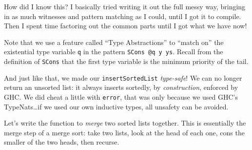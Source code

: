 \documentclass[]{article}
\begin{document}
How did I know this? I basically tried writing it out the full messy way,
bringing in as much witnesses and pattern matching as I could, until I got it to
compile. Then I spent time factoring out the common parts until I got what we
have now!

Note that we use a feature called ``Type Abstractions'' to ``match on'' the
existential type variable \texttt{q} in the pattern \texttt{SCons\ @q\ y\ ys}.
Recall from the definition of \texttt{SCons} that the first type variable is the
minimum priority of the tail.

And just like that, we made our \texttt{insertSortedList} \emph{type-safe}! We
can no longer return an unsorted list: it always inserts sortedly, by
\emph{construction}, enforced by GHC. We did cheat a little with \texttt{error},
that was only because we used GHC's TypeNats\ldots if we used our own inductive
types, all unsafety can be avoided.

Let's write the function to \emph{merge} two sorted lists together. This is
essentially the merge step of a merge sort: take two lists, look at the head of
each one, cons the smaller of the two heads, then recurse.
\end{document}
